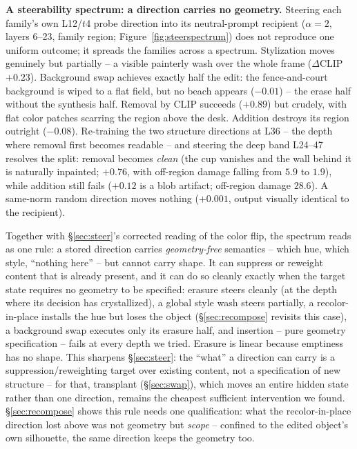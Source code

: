 \documentclass[10pt,twocolumn]{article}
\begin{document}
\textbf{A steerability spectrum: a direction carries no geometry.}
Steering each family's own L12/$t$4 probe direction into its
neutral-prompt recipient ($\alpha{=}2$, layers 6--23, family region;
Figure~\ref{fig:steerspectrum}) does not reproduce one uniform outcome;
it spreads the families across a spectrum. Stylization moves genuinely
but partially -- a visible painterly wash over the whole frame
($\Delta$CLIP $+0.23$). Background swap achieves exactly half the edit:
the fence-and-court background is wiped to a flat field, but no beach
appears ($-0.01$) -- the erase half without the synthesis half. Removal
by CLIP succeeds ($+0.89$) but crudely, with flat color patches scarring
the region above the desk. Addition destroys its region outright
($-0.08$). Re-training the two structure directions at L36 -- the depth
where removal first becomes readable -- and steering the deep band
L24--47 resolves the split: removal becomes \emph{clean} (the cup
vanishes and the wall behind it is naturally inpainted; $+0.76$, with
off-region damage falling from $5.9$ to $1.9$), while addition still
fails ($+0.12$ is a blob artifact; off-region damage $28.6$). A
same-norm random direction moves nothing ($+0.001$, output visually
identical to the recipient).

Together with \S\ref{sec:steer}'s corrected reading of the color flip,
the spectrum reads as one rule: a stored direction carries
\emph{geometry-free} semantics -- which hue, which style, ``nothing
here'' -- but cannot carry shape. It can suppress or reweight content
that is already present, and it can do so cleanly exactly when the
target state requires no geometry to be specified: erasure steers
cleanly (at the depth where its decision has crystallized), a global
style wash steers partially, a recolor-in-place installs the hue but
loses the object (\S\ref{sec:recompose} revisits this case), a
background swap executes only its erasure half, and insertion -- pure
geometry specification -- fails at every depth we tried. Erasure is
linear because emptiness has no shape. This sharpens \S\ref{sec:steer}:
the ``what'' a direction can carry is a suppression/reweighting target
over existing content, not a specification of new structure -- for
that, transplant (\S\ref{sec:swap}), which moves an entire hidden state
rather than one direction, remains the cheapest sufficient intervention
we found. \S\ref{sec:recompose} shows this rule needs one qualification:
what the recolor-in-place direction lost above was not geometry but
\emph{scope} -- confined to the edited object's own silhouette, the same
direction keeps the geometry too.
\end{document}
